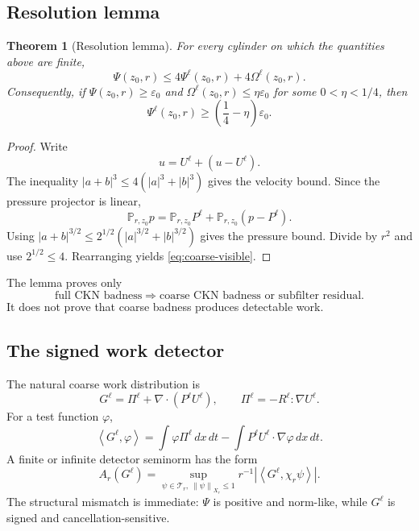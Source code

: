 \documentclass[11pt]{article}
\numberwithin{equation}{section}
\newtheorem{theorem}{Theorem}[section]
\theoremstyle{remark}
\newcommand{\eps}{\varepsilon}
\newcommand{\dxdt}{\,dx\,dt}
\newcommand{\norm}[2]{\left\|#1\right\|_{#2}}
\newcommand{\abs}[1]{\left|#1\right|}
\newcommand{\ip}[2]{\left\langle #1,#2\right\rangle}
\newcommand{\calT}{\mathcal T}
\begin{document}
\subsection{Resolution lemma}

\begin{theorem}[Resolution lemma]\label{thm:resolution}
For every cylinder on which the quantities above are finite,
\begin{equation}\label{eq:resolution}
\Psi(z_0,r)\le4\Psi^\ell(z_0,r)+4\Omega^\ell(z_0,r).
\end{equation}
Consequently, if $\Psi(z_0,r)\ge\eps_0$ and
$\Omega^\ell(z_0,r)\le\eta\eps_0$ for some $0<\eta<1/4$, then
\begin{equation}\label{eq:coarse-visible}
\Psi^\ell(z_0,r)\ge\left(\frac14-\eta\right)\eps_0.
\end{equation}
\end{theorem}

\begin{proof}
Write
\[
u=U^\ell+(u-U^\ell).
\]
The inequality $|a+b|^3\le4(|a|^3+|b|^3)$ gives the velocity bound. Since the pressure projector is linear,
\[
\mathbb P_{r,z_0}p
=
\mathbb P_{r,z_0}P^\ell
+
\mathbb P_{r,z_0}(p-P^\ell).
\]
Using $|a+b|^{3/2}\le2^{1/2}(|a|^{3/2}+|b|^{3/2})$ gives the pressure bound. Divide by $r^2$ and use $2^{1/2}\le4$. Rearranging yields \eqref{eq:coarse-visible}.
\end{proof}

The lemma proves only
\begin{equation}\label{eq:first-bridge}
\text{full CKN badness}
\Longrightarrow
\text{coarse CKN badness or subfilter residual}.
\end{equation}
It does not prove that coarse badness produces detectable work.

\subsection{The signed work detector}

The natural coarse work distribution is
\begin{equation}\label{eq:G}
G^\ell
=
\Pi^\ell+\nabla\cdot(P^\ell U^\ell),
\qquad
\Pi^\ell=-R^\ell:\nabla U^\ell.
\end{equation}
For a test function $\varphi$,
\[
\ip{G^\ell}{\varphi}
=
\int \varphi\Pi^\ell\dxdt
-
\int P^\ell U^\ell\cdot\nabla\varphi\dxdt.
\]
A finite or infinite detector seminorm has the form
\begin{equation}\label{eq:detector-seminorm}
A_r(G^\ell)
=
\sup_{\psi\in\calT_r,\ \norm{\psi}{X_r}\le1}
r^{-1}\abs{\ip{G^\ell}{\chi_r\psi}}.
\end{equation}
The structural mismatch is immediate: $\Psi$ is positive and norm-like, while $G^\ell$ is signed and cancellation-sensitive.
\end{document}
